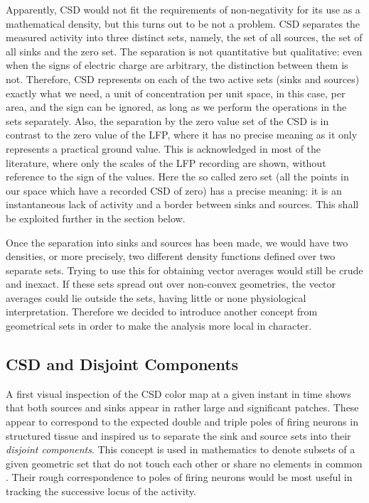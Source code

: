 \documentclass{article}
\begin{document}
Apparently, CSD would not fit the requirements of non-negativity for its use as a mathematical density, but this turns out to be not a problem.  CSD separates the measured activity into three distinct sets, namely, the set of all sources, the set of all sinks and the zero set. The separation is not quantitative but qualitative: even when the signs of electric charge are arbitrary, the distinction between them is not. Therefore, CSD represents on each of the two active sets (sinks and sources) exactly what we need, a unit of concentration per unit space, in this case, per area, and the sign can be ignored, as long as we perform the operations in the sets separately. Also, the separation by the zero value set of the CSD is in contrast to the zero value of the LFP, where it has no precise meaning as it only represents a practical ground value. This is acknowledged in most of the literature, where only the scales of the LFP recording are shown, without reference to the sign of the values. Here the so called zero set (all the points in our space which have a recorded CSD of zero)  has a precise meaning: it is an instantaneous lack of activity and a border between sinks and sources. This shall be exploited further in the section below.

Once the separation into sinks and sources has been made, we would have two densities, or more precisely, two different density functions defined over two separate sets. Trying to use this for obtaining vector averages would still be crude and inexact. If these sets spread out over non-convex geometries, the vector averages could lie outside the sets, having little or none physiological interpretation. Therefore we decided to introduce another concept from geometrical sets in order to make the analysis more local in character.


\subsection{CSD and Disjoint Components}

A first visual inspection of the CSD color map at a given instant in time shows that both sources and sinks appear in rather large and significant patches. These appear to correspond to the expected double and triple poles of firing neurons in structured tissue \cite{Buzsaki2012} and inspired us to separate the sink and source  sets into their \emph{disjoint components}. This concept is used in mathematics to denote subsets of a given geometric set that do not touch each other or share no elements in common \cite{Halmos}. Their rough correspondence to poles of firing neurons would be most useful in tracking the successive locus of the activity.
\end{document}
